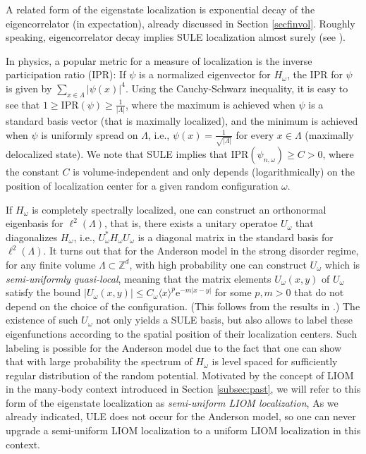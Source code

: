 \documentclass[12pt, a4paper,reqno]{amsart}
\numberwithin{equation}{section}
\newcommand\Z{\mathbb Z}
\newcommand\e{\mathrm{e}}
\newcommand{\abs}[1]{\left\lvert #1 \right\rvert}
\newcommand\La{\Lambda}
\begin{document}
\begin{enumerate}
 A related form of the eigenstate localization is exponential decay of the eigencorrelator (in expectation), already discussed in Section \ref{secfinvol}. Roughly speaking,  eigencorrelator decay implies SULE localization almost surely (see \cite{AW}).
 
 In physics, a popular metric for a measure of localization is the inverse participation ratio (IPR): If $\psi$ is a normalized eigenvector for $H_\omega$, the IPR for $\psi$ is given by $\sum_{x\in\La}\abs{\psi(x)}^4$. Using the Cauchy-Schwarz inequality, it is easy to see that 
 $1\ge\mathrm{IPR}(\psi)\ge \frac1{\abs{\La}}$, where the maximum is achieved when $\psi$ is a standard basis vector (that is maximally  localized), and the minimum is achieved when $\psi$ is uniformly spread on $\La$, i.e.,  $\psi(x)= \frac1{\sqrt{\abs{\La}}}$ for every $x\in\La$ (maximally delocalized state). We note that SULE implies that $\mathrm{IPR}(\psi_{n,\omega})\ge C>0$, where the constant $C$ is volume-independent and only depends (logarithmically) on the position of localization center for a given random configuration $\omega$.
 
If $H_\omega$ is completely spectrally localized, one can construct an orthonormal eigenbasis for $\ell^2(\La)$, that is, there exists a unitary operatoe $U_\omega$ that diagonalizes  $H_\omega$, i.e., $U_\omega^*H_\omega U_\omega$ is a diagonal matrix in the standard basis for $\ell^2(\La)$. It turns out  that for the Anderson model in the strong disorder regime, for any finite volume $\La\subset\Z^d$,  with high probability one can construct $U_\omega$ which is {\it semi-uniformly  quasi-local}, meaning that the matrix elements  $U_\omega(x,y)$ of $U_\omega$ satisfy the bound $|U_\omega(x,y)|\le  C_{\omega}\langle x\rangle^p\e^{-m|x-y|}$ for some $p,m>0$ that do not depend on the choice of the configuration. (This follows from the results in  \cite{EK}.)  The existence of such $U_\omega$ not only yields a SULE basis, but also allows to label these eigenfunctions according to the spatial position of their localization centers.  Such labeling is possible for the Anderson model due to the fact that one can show that with large probability the spectrum of $H_\omega$ is level spaced for  sufficiently regular distribution of the random potential.  Motivated by the concept of LIOM in the many-body context introduced in Section \ref{subsec:past}, we will refer to this form of the eigenstate localization as {\it semi-uniform LIOM localization}, As we already indicated, ULE does not occur for the Anderson model, so one can never upgrade a semi-uniform LIOM localization to a uniform LIOM localization in this context. 


\end{enumerate}
\end{document}
